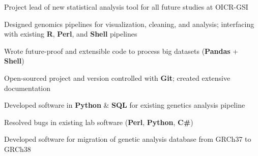 \documentclass[]{chandan-cv}
\begin{document}
\begin{minipage}[t]{0.77\textwidth}

\begin{tightemize}
	\item Project lead of new statistical analysis tool for all future studies at OICR-GSI
	\item Designed genomics pipelines for visualization, cleaning, and analysis; 
	interfacing with existing \textbf{R}, \textbf{Perl}, and \textbf{Shell} pipelines
	\item Wrote future-proof and extensible code to process big datasets (\textbf{Pandas} + \textbf{Shell})
	\item Open-sourced project and version controlled with \textbf{Git}; created extensive documentation
\end{tightemize}
\sectionsep

\begin{tightemize}
	\item Developed software in \textbf{Python} \& \textbf{SQL} for existing genetics analysis pipeline 
	\item Resolved bugs in existing lab software (\textbf{Perl}, \textbf{Python}, \textbf{C\#})
	\item Developed software for migration of genetic analysis database from GRCh37 to GRCh38
\end{tightemize}
\sectionsep



\end{minipage}
\end{document}
